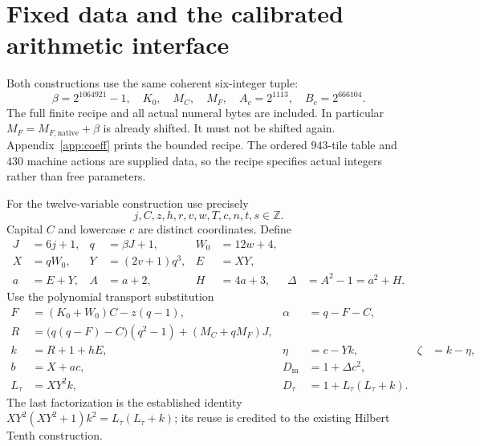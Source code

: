 \documentclass[11pt,a4paper]{article}
\theoremstyle{definition}\newtheorem{definition}[theorem]{Definition}
\theoremstyle{remark}\newtheorem{remark}[theorem]{Remark}
\newcommand{\Z}{\mathbb Z}\newcommand{\Q}{\mathbb Q}\newcommand{\N}{\mathbb N}\newcommand{\R}{\mathbb R}
\newcommand{\Dm}{D_{\mathrm m}}\newcommand{\Df}{D_{\mathrm f}}
\newcommand{\Dt}{D_{\tau}}\newcommand{\Da}{D_{\mathrm a}}
\numberwithin{equation}{section}
\begin{document}
\section{Fixed data and the calibrated arithmetic interface}
\label{sec:interface}

Both constructions use the same coherent six-integer tuple:
\begin{equation}
 \beta=2^{1064921}-1,\quad K_0,\quad M_C,\quad M_F,
 \quad A_c=2^{1113},\quad B_c=2^{666104}.
 \label{eq:ports}
\end{equation}
The full finite recipe and all actual numeral bytes are included. In
particular $M_F=M_{F,\mathrm{native}}+\beta$ is already shifted. It must
not be shifted again. Appendix~\ref{app:coeff} prints the bounded recipe.
The ordered $943$-tile table and $430$ machine actions are supplied data,
so the recipe specifies actual integers rather than free parameters.

For the twelve-variable construction use precisely
\begin{equation}
 \boxed{j,C,z,h,r,v,w,T,c,n,t,s\in\Z.}
 \label{eq:variables12}
\end{equation}
Capital $C$ and lowercase $c$ are distinct coordinates. Define
\begin{align}
 J&=6j+1,&q&=\beta J+1,&W_0&=12w+4,\nonumber\\
 X&=qW_0,&Y&=(2v+1)q^3,&E&=XY,\nonumber\\
 a&=E+Y,&A&=a+2,&H&=4a+3,&\Delta&=A^2-1=a^2+H.
 \label{eq:front12}
\end{align}
Use the polynomial transport substitution
\begin{align}
 F&=(K_0+W_0)C-z(q-1),&\alpha&=q-F-C,\nonumber\\
 R&=\bigl(q(q-F)-C\bigr)(q^2-1)+(M_C+qM_F)J,\nonumber\\
 k&=R+1+hE,&\eta&=c-Yk,&\zeta&=k-\eta,\nonumber\\
 b&=X+ac,&\Dm&=1+\Delta c^2,\nonumber\\
 L_\tau&=XY^2k,&\Dt&=1+L_\tau(L_\tau+k).
 \label{eq:transport12}
\end{align}
The last factorization is the established identity
$XY^2(XY^2+1)k^2=L_\tau(L_\tau+k)$; its reuse is credited to the
existing Hilbert Tenth construction.
\end{document}
